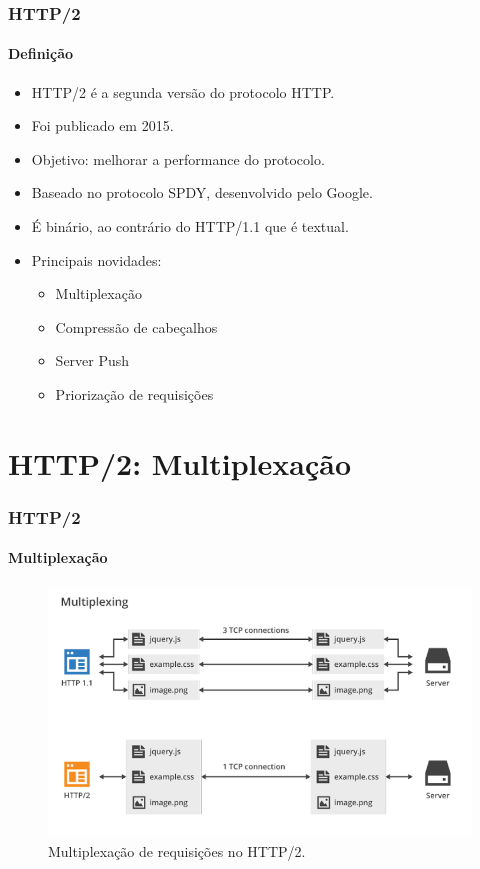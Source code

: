 \documentclass[
	9pt, %
	t, %
]{beamer}
\begin{document}
\begin{frame}
	\frametitle{HTTP/2}
	\framesubtitle{Definição}

	\begin{itemize}
		\item HTTP/2 é a segunda versão do protocolo HTTP.
		\item Foi publicado em 2015.
		\item Objetivo: melhorar a performance do protocolo.
		\item Baseado no protocolo SPDY, desenvolvido pelo Google.
		\item É binário, ao contrário do HTTP/1.1 que é textual.
		\item Principais novidades:
		\begin{itemize}
			\item Multiplexação
			\item Compressão de cabeçalhos
			\item Server Push
			\item Priorização de requisições
		\end{itemize}
	\end{itemize}

\end{frame}

\section{HTTP/2: Multiplexação}

\begin{frame}
	\frametitle{HTTP/2}
	\framesubtitle{Multiplexação}

	\begin{figure}
		\centering
		\includegraphics[width=0.9\linewidth]{http_2_multiplexing.png}
		\caption{Multiplexação de requisições no HTTP/2.}
	\end{figure}

\end{frame}
\end{document}
